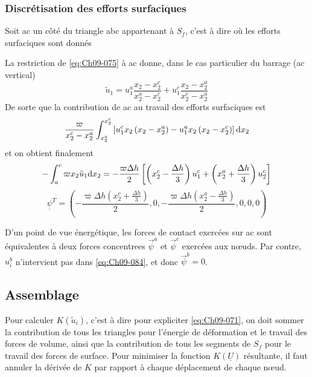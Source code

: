 \subsubsection{Discrétisation des efforts surfaciques}
Soit ac un côté du triangle abc appartenant à $S_f$, c'est à dire où les efforts surfaciques sont donnés

La restriction de \eqref{eq:Ch09-075} à ac donne, dans le cas particulier du barrage (ac vertical) 
\begin{equation}
    \tilde{u}_1 = u_1^a \frac{x_2 - x_2^c}{x_2^a -x_2^c} + u_1^c \frac{x_2 - x_2^a}{x_2^c -x_2^a}
    \label{eq:Ch09-084}
\end{equation}
De sorte que la contribution de ac au travail des efforts surfaciques est 
\[
\frac{\varpi}{x_2^c -x_2^a} \int_{x_2^a}^{x_2^c} \left[ u_1^c x_2 \left( x_2 - x_2^a \right) - u_1^a x_2 \left( x_2 - x_2^c \right) \right] \mathrm{d} x_2
\]
et on obtient finalement
\begin{equation}
    - \int_{a}^c \varpi x_2 \tilde{u}_1 \mathrm{d} x_2 = - \frac{\varpi \Delta h}{2} \left[ \left( x_2^c - \frac{\Delta h}{3} \right) u_1^c + \left( x_2^a + \frac{\Delta h}{3} \right) u_2^c \right]
    \label{eq:Ch09-085}
\end{equation}
\begin{equation}
    \underline{\psi}^T = \left( - \frac{\varpi \Delta h \left( x_2^c + \frac{\Delta h}{3} \right)}{2}, 0, - \frac{\varpi \Delta h \left( x_2^a - \frac{\Delta h}{3} \right)}{2}, 0, 0, 0 \right)
    \label{eq:Ch09-086}
\end{equation}

D'un point de vue énergétique, les forces de contact exercées sur  ac sont équivalentes à deux forces concentrees  $\vec{\psi}^a$ et $\vec{\psi}^c$ exercées aux nœuds.
Par contre,  $u_i^b$ n'intervient pas dans \eqref{eq:Ch09-084}, et donc $\vec{\psi}^b=0$.

\subsection{Assemblage} \label{ssec:Ch09-3.4}
Pour calculer $K \left( \tilde{u}_i \right)$, c'est à dire pour expliciter \eqref{eq:Ch09-071}, on doit sommer la contribution de tous les triangles pour l'énergie de déformation et le travail des forces de volume, ainsi que la contribution de tous les segments de $S_f$ pour le travail des forces de surface.
Pour minimiser la fonction $K\left( \underline{U} \right)$ résultante, il faut annuler la dérivée de $K$ par rapport à chaque déplacement de chaque nœud. 
